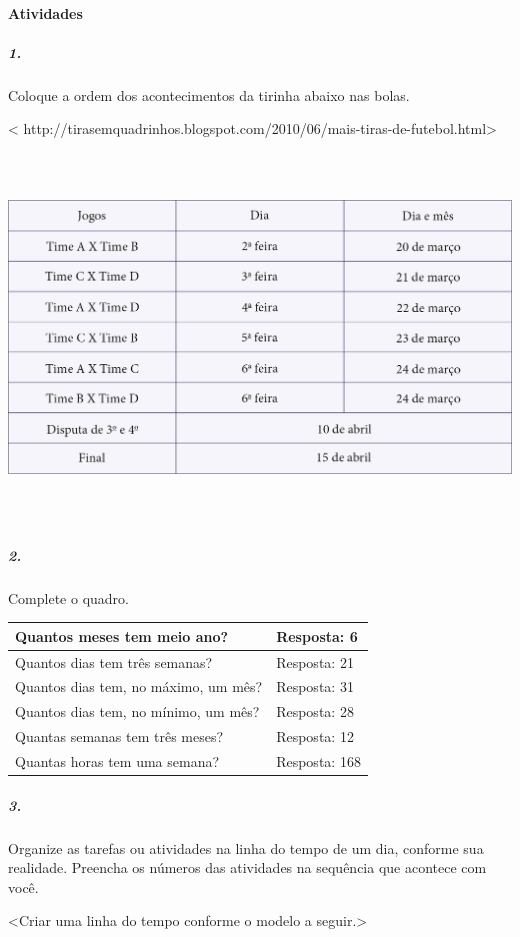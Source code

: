 \paragraph{Atividades }\label{atividades-3}

\subparagraph{1.}\label{section-42}

Coloque a ordem dos acontecimentos da tirinha abaixo nas bolas.

\textless{}
http://tirasemquadrinhos.blogspot.com/2010/06/mais-tiras-de-futebol.html\textgreater{}

\includegraphics[width=6.06250in,height=3.83958in]{media/image58.png}

\subparagraph{2.}\label{section-43}

Complete o quadro.

\begin{longtable}[]{@{}ll@{}}
\toprule
Quantos meses tem meio ano? & Resposta: 6\tabularnewline
\midrule
\endhead
Quantos dias tem três semanas? & Resposta: 21\tabularnewline
Quantos dias tem, no máximo, um mês? & Resposta: 31\tabularnewline
Quantos dias tem, no mínimo, um mês? & Resposta: 28\tabularnewline
Quantas semanas tem três meses? & Resposta: 12\tabularnewline
Quantas horas tem uma semana? & Resposta: 168\tabularnewline
\bottomrule
\end{longtable}

\subparagraph{3.}\label{section-44}

Organize as tarefas ou atividades na linha do tempo de um dia, conforme
sua realidade. Preencha os números das atividades na sequência que
acontece com você.

\textless{}Criar uma linha do tempo conforme o modelo a
seguir.\textgreater{}

